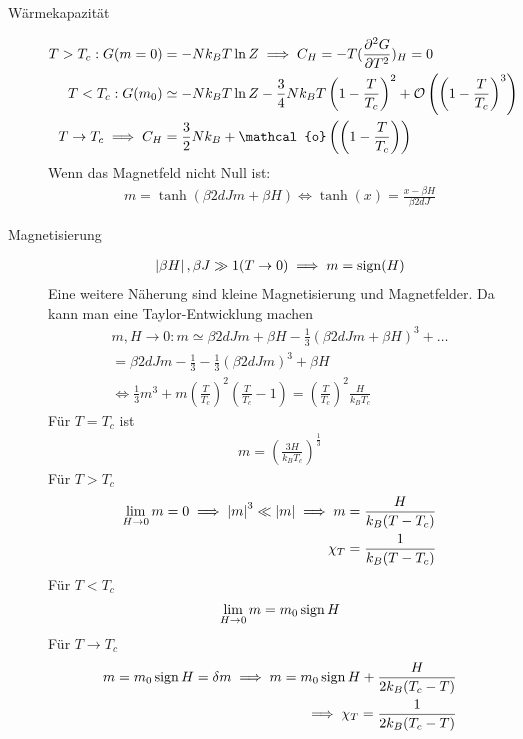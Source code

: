 \begin{description}
  \item[Wärmekapazität]
    \begin{align*}
      T > T_c : G(m=0) & = - N k_B T \ln{ Z} \implies C_H = - T (\pd{^2 G}{T^2})_H = 0 \\
      T < T_c : G(m_0) & \simeq - N k_B T \ln{Z} - \frac{3}{4} N k_B T \left( 1 - \frac{T}{T_c} \right)^2
      + \mathcal{O}\left( \left( 1 - \frac{T}{T_c} \right)^3 \right) \\
      T \to T_c \implies C_H & = \frac{3}{2} N k_B + \mathcal{o}\left( \left( 1 - \frac{T}{T_c} \right) \right)
    \end{align*}
    Wenn das Magnetfeld nicht Null ist:
    \begin{align*}
      m = \tanh(\beta 2 d J m + \beta H) \iff \tanh(x) = \frac{x - \beta H}{\beta 2 d J}
    \end{align*}
  \item[Magnetisierung]
    \begin{align*}
      \left| \beta H \right|, \beta J \gg 1 (T\to 0) \implies m = \operatorname{sign}(H)
    \end{align*}
    Eine weitere Näherung sind kleine Magnetisierung und Magnetfelder.
    Da kann man eine Taylor-Entwicklung machen
    \begin{align*}
      m, H \to 0: m \simeq \beta 2 d J m + \beta H - \frac{1}{3} \left( \beta 2 d J m + \beta H \right)^3 + \ldots\\
      = \beta 2 d J m  - \frac{1}{3 } - \frac{1}{3} \left( \beta 2 d J m  \right)^3 + \beta H \\
      \iff \frac{1}{3} m^3 + m (\frac{T}{T_c})^2 \left( \frac{T}{T_c} - 1 \right) = 
      \left( \frac{T}{T_c} \right)^2 \frac{H}{k_B T_c}
    \end{align*}
    Für $T= T_c$ ist
    \begin{align*}
      m = \left( \frac{3 H}{k_B T_c} \right)^{\frac{1}{3}}
    \end{align*}
    Für $ T > T_c$
    \begin{align*}
      \lim_{H\to  0} m= 0 \implies \left| m \right|^3 \ll \left| m \right| \implies m = \frac{H}{k_B (T- T_c)} \\
      \chi_T = \frac{1}{k_B (T - T_c)}
    \end{align*}
    Für $ T < T_c$
    \begin{align*}
      \lim_{H\to  0} m = m_0 \operatorname{sign} H
    \end{align*}
    Für $ T \to T_c$
    \begin{align*}
      m = m_0 \operatorname{sign} H = \delta m \implies m = m_0 \operatorname{sign} H + \frac{H}{2 k_B (T_c - T)} \\
      \implies \chi_T = \frac{1}{2 k_B(T_c -T)}
    \end{align*}
    
    
    
    
    
    

    
    
  
\end{description}



